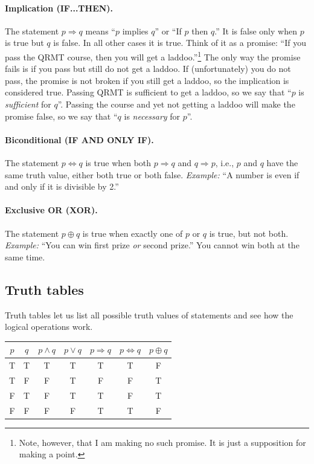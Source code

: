\paragraph{Implication (IF...THEN).}
The statement $p \Rightarrow q$ means ``$p$ implies $q$'' or ``If $p$ then $q$.''  
It is false only when $p$ is true but $q$ is false.  
In all other cases it is true.  
Think of it as a promise:  
``If you pass the QRMT course, then you will get a laddoo.''\footnote{Note, however, that I am making no such promise. It is just a supposition for making a point.} The only way the promise fails is if you pass but still do not get a laddoo.  
If (unfortunately) you do not pass, the promise is not broken if you still get a laddoo, so the implication is considered true. Passing QRMT is sufficient to get a laddoo, so we say that ``$p$ is {\em sufficient} for $q$''. Passing the course and yet not getting a laddoo will make the promise false, so we say that ``$q$ is {\em necessary} for $p$''.

\paragraph{Biconditional (IF AND ONLY IF).}
The statement $p \Leftrightarrow q$ is true when both  $p \Rightarrow q$ and  $q \Rightarrow p$, i.e., $p$ and $q$ have the same truth value, 
either both true or both false.  
\emph{Example:} ``A number is even if and only if it is divisible by 2.''

\paragraph{Exclusive OR (XOR).}
The statement $p \oplus q$ is true when exactly one of $p$ or $q$ is true, but not both.  
\emph{Example:} ``You can win first prize \emph{or} second prize.''  
You cannot win both at the same time.

\subsection{Truth tables}
Truth tables let us list all possible truth values of statements and see how the logical operations work.

\begin{center}
\begin{tabular}{|c|c||c|c|c|c|c|}
\hline
$p$ & $q$ & $p \land q$ & $p \lor q$ & $p \Rightarrow q$ & $p \Leftrightarrow q$ & $p \oplus q$ \\
\hline
T & T & T & T & T & T & F \\
T & F & F & T & F & F & T \\
F & T & F & T & T & F & T \\
F & F & F & F & T & T & F \\
\hline
\end{tabular}
\end{center}

